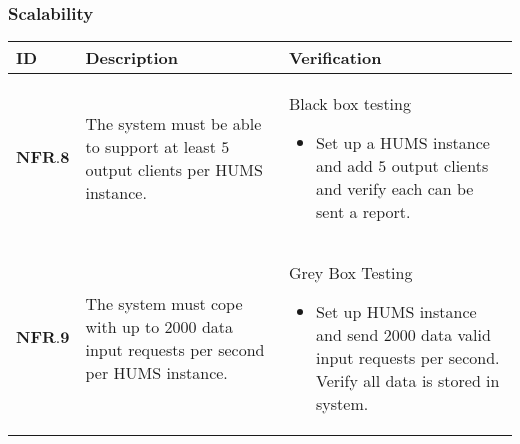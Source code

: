 \subsubsection{Scalability}
\begin{longtable}[H]{|p{1.5cm}|p{4.5cm}|p{10.5cm}|}
    \hline
    \cellcolor{titleColor}\textbf{ID} & \cellcolor{titleColor}\textbf{Description} & \cellcolor{titleColor}\textbf{Verification} \\ \hline
   $ \textbf{NFR.8} $& The system must be able to support at least $5$ output clients per HUMS instance. & Black box testing\begin{itemize}\item Set up a HUMS instance and add $5$ output clients and verify each can be sent a report.\end{itemize} \\ \hline
   $  \textbf{NFR.9} $& The system must cope with up to $2000$ data input requests per second per HUMS instance. & Grey Box Testing\begin{itemize}\item Set up HUMS instance and send $2000$ data valid input requests per second. Verify all data is stored in  system.\end{itemize} \\ \hline
\end{longtable}

